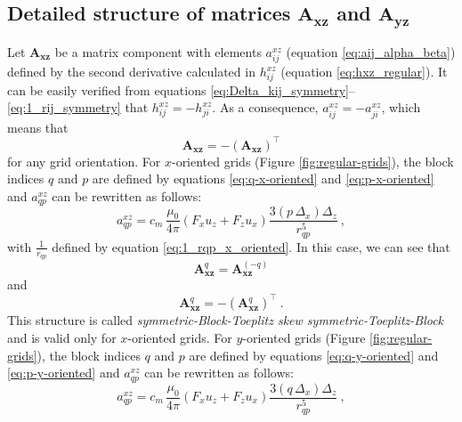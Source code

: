 \documentclass[manuscript]{geophysics}
\begin{document}
\subsection{Detailed structure of matrices $\mathbf{A_{xz}}$ and $\mathbf{A_{yz}}$}

Let $\mathbf{A}_{\boldsymbol{xz}}$ be a matrix component with elements
$a^{xz}_{ij}$ (equation \ref{eq:aij_alpha_beta}) defined by the second derivative calculated in
$h^{xz}_{ij}$ (equation \ref{eq:hxz_regular}). It can be easily verified from equations
\ref{eq:Delta_kij_symmetry}--\ref{eq:1_rij_symmetry} that $h^{xz}_{ij} = -h^{xz}_{ji}$.
As a consequence, $a^{xz}_{ij} = -a^{xz}_{ji}$, which means that 
\begin{equation}
	\mathbf{A}_{\boldsymbol{xz}} = -\left( \mathbf{A}_{\boldsymbol{xz}} \right)^{\top}
	\label{eq:Axz_symmetry}
\end{equation} 
for any grid orientation.
For $x$-oriented grids (Figure \ref{fig:regular-grids}), the block indices $q$ and $p$ are defined 
by equations \ref{eq:q-x-oriented} and 
\ref{eq:p-x-oriented} and $a^{xz}_{qp}$ can be rewritten as follows:
\begin{equation}
	a^{xz}_{qp} = c_{m} \, \frac{\mu_{0}}{4\pi} 
	\left( F_{x} u_{z} + F_{z} u_{x} \right) \frac{3 \left( p \, \Delta_{x} \right) \Delta_{z}}{r_{qp}^{5}}
	\: ,
	\label{eq:aqp_xz_x_oriented}
\end{equation}
with $\tfrac{1}{r_{qp}}$ defined by equation \ref{eq:1_rqp_x_oriented}.
In this case, we can see that
\begin{equation}
	\mathbf{A}_{\boldsymbol{xz}}^{q} = \mathbf{A}_{\boldsymbol{xz}}^{(-q)}
	\label{eq:Axz_q_external_block_symmetry_x_oriented}
\end{equation}
and 
\begin{equation}
	\mathbf{A}_{\boldsymbol{xz}}^{q} = -\left( \mathbf{A}_{\boldsymbol{xz}}^{q} \right)^{\top} \: .
	\label{eq:Axz_q_internal_block_symmetry_x_oriented}
\end{equation}
This structure is called \textit{symmetric-Block-Toeplitz skew symmetric-Toeplitz-Block} and is 
valid only for $x$-oriented grids.
For $y$-oriented grids (Figure \ref{fig:regular-grids}), the block indices $q$ and $p$ are 
defined by equations \ref{eq:q-y-oriented} and 
\ref{eq:p-y-oriented} and $a^{xz}_{qp}$ can be rewritten as follows:
\begin{equation}
	a^{xz}_{qp} = c_{m} \, \frac{\mu_{0}}{4\pi} 
	\left( F_{x} u_{z} + F_{z} u_{x} \right) \frac{3 \left( q \, \Delta_{x} \right) \Delta_{z}}{r_{qp}^{5}} \: ,
	\label{eq:aqp_xz_y_oriented}
\end{equation}
\end{document}
